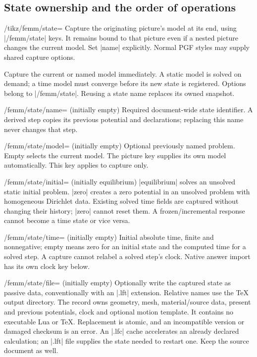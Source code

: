 \subsection{State ownership and the order of operations}
\label{sec:time-keys}
\begin{key}{/tikz/femm/state=}
Capture the originating picture's model at its end, using |/femm/state| keys.
It remains bound to that picture even if a nested picture changes the current
model. Set |name| explicitly. Normal PGF styles may supply shared capture options.
\end{key}
\begin{command}{\femmstate{}}
Capture the current or named model immediately. A static model is solved on
demand; a time model must converge before its new state is registered. Options
belong to |/femm/state|. Reusing a state name replaces its owned snapshot.
\end{command}
\begin{key}{/femm/state/name= (initially empty)}
Required document-wide state identifier. A derived step copies its previous
potential and declarations; replacing this name never changes that step.
\end{key}
\begin{key}{/femm/state/model= (initially empty)}
Optional previously named problem. Empty selects the current model. The picture
key supplies its own model automatically. This key applies to capture only.
\end{key}
\begin{key}{/femm/state/initial= (initially equilibrium)}
|equilibrium| solves an unsolved static initial problem. |zero| creates a zero
potential in an unsolved problem with homogeneous Dirichlet data. Existing
solved time fields are captured without changing their history; |zero| cannot
reset them. A frozen/incremental response cannot become a time state or vice versa.
\end{key}
\begin{key}{/femm/state/time= (initially empty)}
Initial absolute time, finite and nonnegative; empty means zero for an initial
state and the computed time for a solved step. A capture cannot relabel a solved
step's clock. Native answer import has its own clock key below.
\end{key}
\begin{key}{/femm/state/file= (initially empty)}
Optionally write the captured state as passive data, conventionally with an
|.lft| extension. Relative names use the TeX output directory. The record owns
geometry, mesh, material/source data, present and previous potentials, clock and
optional motion template. It contains no executable Lua or TeX. Replacement is
atomic, and an incompatible version or damaged checksum is an error.
An |.lfc| cache accelerates an already declared calculation; an |.lft| file
supplies the state needed to restart one. Keep the source document as well.
\end{key}
